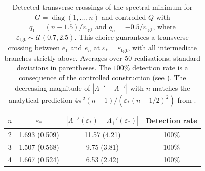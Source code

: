 \begin{table}[htbp]\centering
\caption{Detected transverse crossings of the spectral minimum for
$G=\operatorname{diag}(1,\dots,n)$ and controlled $Q$ with
$q_1=(n-1.5)/\varepsilon_{\mathrm{tgt}}$ and
$q_n=-0.5/\varepsilon_{\mathrm{tgt}}$, where
$\varepsilon_{\mathrm{tgt}}\sim\mathcal{U}(0.7,2.5)$. This choice guarantees
a transverse crossing between $e_1$ and $e_n$ at
$\varepsilon_*=\varepsilon_{\mathrm{tgt}}$, with all intermediate branches
strictly above. Averages over 50 realisations; standard deviations in
parentheses. The $100\%$ detection rate is a consequence of the controlled
construction (see ). The decreasing magnitude of
$|\Lambda_-'-\Lambda_+'|$ with $n$ matches the analytical prediction
$4\pi^{2}(n-1)/(\varepsilon_*(n-1/2)^{2})$ from .}
\label{tab:crossings}
\begin{tabular}{cccc}\hline
\(n\) & \(\varepsilon_*\) & \(|\Lambda_-'(\varepsilon_*) - \Lambda_+'(\varepsilon_*)|\) & Detection rate \\\hline
2 & 1.693 (0.509) & 11.57 (4.21) & 100\% \\
3 & 1.507 (0.568) & 9.75 (3.81) & 100\% \\
4 & 1.667 (0.524) & 6.53 (2.42) & 100\% \\
\hline\end{tabular}\end{table}
